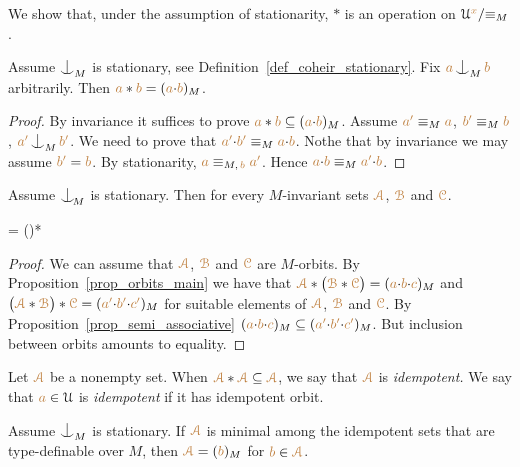 We show that, under the assumption of stationarity,
$*$ is an operation on  $\EuScript U^{\color{brown} x}/{\equiv_M}$.

\begin{proposition}\label{prop_orbits_main}
Assume $\nonfork_M$ is stationary,
see Definition~\ref{def_coheir_stationary}.
Fix ${\mr a}\nonfork_M{\mr b}$ arbitrarily.
Then ${\color{brown} a}*{\color{brown} b}=({\color{brown} a}{\cdot}{\color{brown} b})_M$.
\end{proposition}
%
\begin{proof}
  By invariance it suffices to prove ${\color{brown} a}*{\color{brown} b}\subseteq({\color{brown} a}{\cdot}{\color{brown} b})_M$.
  Assume ${\color{brown} a'}\equiv_M{\color{brown} a}$, ${\color{brown} b'}\equiv_M{\color{brown} b}$, ${\mr a'}\nonfork_M{\mr b'}$.
  We need to prove  that ${\color{brown} a'}{\cdot}{\color{brown} b'}\equiv_M{\color{brown} a}{\cdot}{\color{brown} b}$.
  Nothe that by invariance we may assume ${\color{brown} b'}={\color{brown} b}$.
    By stationarity, ${\color{brown} a}\equiv_{M,\,{\color{brown} b}}{\color{brown} a'}$.
  Hence ${\color{brown} a}{\cdot}{\color{brown} b}\equiv_M{\color{brown} a'}{\cdot}{\color{brown} b}$.
\end{proof}

\begin{corollary}[ (associativity)]\label{corol_orbits_associative}
Assume $\nonfork_{\!M}$ is stationary.
Then for every $M$-invariant sets ${\color{brown}\EuScript A}$,
${\color{brown}\EuScript B}$ and  ${\color{brown}\EuScript C}$.

\ceq{\hfill\mrA*\big(\mrB*\mrC\big)}
{=}
{\big(\mrA*\mrB\big)*\mrC}
\end{corollary}

\begin{proof}
We can assume that ${\color{brown}\EuScript A}$, ${\color{brown}\EuScript B}$ and ${\color{brown}\EuScript C}$ are $M$-orbits.
By Proposition~\ref{prop_orbits_main} we have that ${\color{brown}\EuScript A}*\big({\color{brown}\EuScript B}*{\color{brown}\EuScript C}\big)=({\color{brown} a}{\cdot}{\color{brown} b}{\cdot}{\color{brown} c})_M$ and $\big({\color{brown}\EuScript A}*{\color{brown}\EuScript B}\big)*{\color{brown}\EuScript C}=({\color{brown} a'}{\cdot}{\color{brown} b'}{\cdot}{\color{brown} c'})_M$ for suitable elements of ${\color{brown}\EuScript A}$, ${\color{brown}\EuScript B}$ and ${\color{brown}\EuScript C}$.
By Proposition~\ref{prop_semi_associative} $({\color{brown} a}{\cdot}{\color{brown} b}{\cdot}{\color{brown} c})_M\subseteq({\color{brown} a'}{\cdot}{\color{brown} b'}{\cdot}{\color{brown} c'})_M$.
But inclusion between orbits amounts to equality.
\end{proof}

Let ${\color{brown}\EuScript A}$ be a nonempty set.
When ${\color{brown}\EuScript A}*{\color{brown}\EuScript A}\subseteq{\color{brown}\EuScript A}$, we say that ${\color{brown}\EuScript A}$ is \emph{idempotent.}
We say that ${\color{brown} a}\in\EuScript U$ is \emph{idempotent\/} if it has idempotent orbit.

\begin{lemma}\label{lem_Hindman}
Assume $\nonfork_M$ is stationary.
If ${\color{brown}\EuScript A}$ is minimal among the
idempotent sets that are
type-definable over $M$, then ${\color{brown}\EuScript A}=({\color{brown} b})_M$ for ${\color{brown} b}\in{\color{brown}\EuScript A}$.
\end{lemma}

